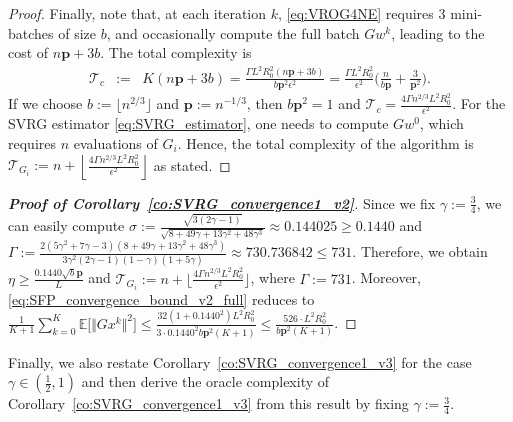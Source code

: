 \documentclass{article}
\newcommand{\norms}[1]{\Vert#1\Vert}
\newcommand{\Expk}[1]{\mathbb{E}\big[#1\big]}
\newcommand{\Tc}{\mathcal{T}}
\newcommand{\mbf}[1]{\mathbf{#1}}
\theoremstyle{plain}
\theoremstyle{definition}
\theoremstyle{remark}
\begin{document}
\begin{proof}
Finally, note that, at each iteration $k$, \eqref{eq:VROG4NE} requires $3$ mini-batches of size $b$, and occasionally compute the full batch $Gw^k$, leading to the cost of $n\mbf{p} + 3b$.
The total complexity is 
\begin{equation*}
\begin{array}{lcl}
\Tc_{c} & := & K(n\mbf{p} + 3b) = \frac{ \Gamma L^2 R_0^2(n\mbf{p} + 3b)}{ b\mbf{p}^2\epsilon^2} = \frac{\Gamma L^2R_0^2}{\epsilon^2}\big(\frac{n}{b\mbf{p}} + \frac{3}{ \mbf{p}^2} \big).
\end{array}
\end{equation*}
If we choose $b := \lfloor n^{2/3} \rfloor$ and $\mbf{p} := n^{-1/3}$, then $b\mbf{p}^2 = 1$ and $\Tc_{c} = \frac{4\Gamma n^{2/3} L^2R_0^2}{\epsilon^2}$.
For the SVRG estimator \eqref{eq:SVRG_estimator}, one needs to compute $Gw^0$, which requires $n$ evaluations of $G_i$.
Hence, the total complexity of the algorithm is $\Tc_{G_i} := n + \left\lfloor\frac{4\Gamma n^{2/3} L^2R_0^2}{\epsilon^2}\right\rfloor$ as stated.
\end{proof}

\begin{proof}[\textbf{Proof of Corollary~\ref{co:SVRG_convergence1_v2}}]
Since we fix $\gamma := \frac{3}{4}$, we can easily compute $\sigma := \frac{\sqrt{3(2\gamma-1)}}{\sqrt{8 + 49\gamma + 13\gamma^2 + 48\gamma^3}} \approx 0.144025 \geq 0.1440$ and $\Gamma := \frac{2(5\gamma^2+7\gamma-3)(8 + 49\gamma + 13\gamma^2 + 48\gamma^3)}{3\gamma^2(2\gamma-1)(1-\gamma)(1+5\gamma)} \approx 730.736842 \leq 731$.
Therefore, we obtain $\eta \geq \frac{0.1440 \sqrt{b}\mbf{p}}{L}$ and $\Tc_{G_i} := n + \big\lfloor \frac{4\Gamma n^{2/3} L^2R_0^2}{\epsilon^2} \big\rfloor$, where $\Gamma := 731$.
Moreover, \eqref{eq:SFP_convergence_bound_v2_full} reduces to $\frac{1}{K+1}\sum_{k=0}^{K} \Expk{ \norms{Gx^k}^2 }   \leq     \frac{32(1 + 0.1440^2) L^2 R_0^2 }{3\cdot 0.1440^2 b\mbf{p}^2 (K + 1)} \leq \frac{526 \cdot L^2R_0^2}{b\mbf{p}^2(K+1)}$.
\end{proof}


Finally, we also restate Corollary~\ref{co:SVRG_convergence1_v3} for the case $\gamma \in \left(\frac{1}{2}, 1\right)$ and then derive the oracle complexity of Corollary~\ref{co:SVRG_convergence1_v3}  from this result by fixing $\gamma := \frac{3}{4}$.
\end{document}
